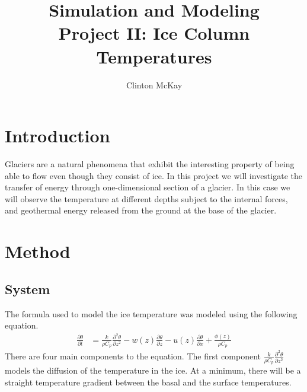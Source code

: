 \documentclass{article}%
\begin{document}
    \title{Simulation and Modeling\\Project II: Ice Column Temperatures}
    \author{Clinton McKay}
    \maketitle

    \twocolumn

    \section{Introduction}
    Glaciers are a natural phenomena that exhibit the interesting property of being able to flow even
    though they consist of ice. 
    In this project we will investigate the transfer of energy through 
    one-dimensional section of a glacier. 
    In this case we will observe the temperature at different depths 
    subject to the internal forces, and geothermal energy released from the ground at the base of the 
    glacier. 

    \section{Method}
    \subsection{System}
    The formula used to model the ice temperature was modeled using the following equation.
    \begin{align*}
           \frac{\partial \theta}{\partial t} &= \frac{k}{\rho C_p} \frac{\partial^2 \theta}{\partial z^2}
                                              -w(z) \frac{\partial \theta}{\partial z}
                                              -u(z) \frac{\partial \theta}{\partial x}
                                              +\frac{\phi(z)}{\rho C_p}
    \end{align*} 
    There are four main components to the equation. The first component $\frac{k}{\rho C_p} \frac{\partial^2 \theta}{\partial z^2}$ models the diffusion of the temperature in the ice. At a minimum, there will be a straight temperature gradient between the basal and the surface temperatures.
\end{document}
